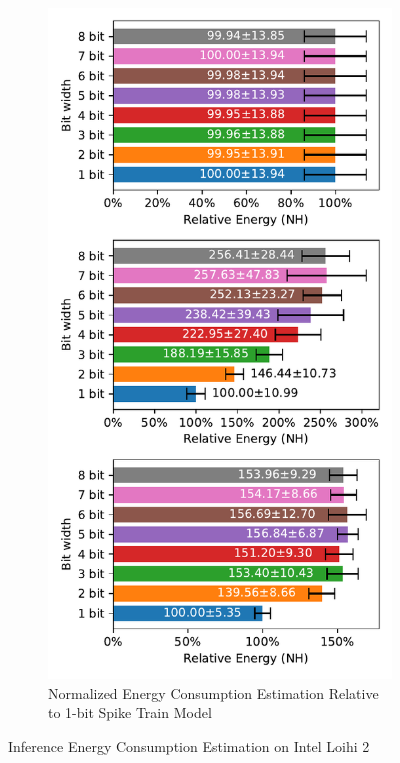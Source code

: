         \begin{figure}[H]
            \centering
            \ContinuedFloat
            \begin{subfigure}[H]{0.7\textwidth}
                \centering
                \includegraphics[width=\textwidth]{../standard/MNIST/plots/mnist_test_relative_energy_nh.pdf}
                \caption{Normalized Energy Consumption Estimation Relative to 1-bit Spike Train Model}
            \end{subfigure}
            \caption{Inference Energy Consumption Estimation on Intel Loihi 2}
        \end{figure}

